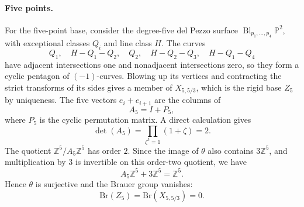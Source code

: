 \documentclass[11pt]{article}
\theoremstyle{plain}
\theoremstyle{definition}
\theoremstyle{remark}
\newcommand{\Pp}{\mathbb P}
\newcommand{\Z}{\mathbb Z}
\newcommand{\Bl}{\operatorname{Bl}}
\newcommand{\Br}{\mathrm{Br}}
\begin{document}
\paragraph{Five points.}
For the five-point base, consider the degree-five del Pezzo surface
\(\Bl_{p_1,\dots,p_4}\Pp^2\), with exceptional classes \(Q_i\) and line
class \(H\). The curves
\[
Q_1,\quad H-Q_1-Q_2,\quad Q_2,\quad H-Q_2-Q_3,\quad H-Q_1-Q_4
\]
have adjacent intersections one and nonadjacent intersections zero, so
they form a cyclic pentagon of \((-1)\)-curves. Blowing up its vertices
and contracting the strict transforms of its sides gives a member of \(X_{5,5/3}\), which is the rigid base \(Z_5\) by
uniqueness. The five vectors
\(e_i+e_{i+1}\) are the columns of
\[
A_5=I+P_5,
\]
where \(P_5\) is the cyclic permutation matrix. A direct calculation gives
\[
\det(A_5)=\prod_{\zeta^5=1}(1+\zeta)=2.
\]
The quotient \(\Z^5/A_5\Z^5\) has order \(2\). Since the image of \(\theta\) also
contains \(3\Z^5\), and multiplication by \(3\) is invertible on this
order-two quotient, we have
\[
A_5\Z^5+3\Z^5=\Z^5.
\]
Hence \(\theta\) is surjective and the Brauer group vanishes:
\[
\Br(Z_5)=\Br(X_{5,5/3})=0.
\]
\end{document}
